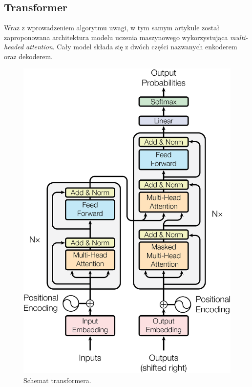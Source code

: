 \documentclass[data-science]{agh-wi} %
\begin{document}
\subsection{Transformer}
Wraz z wprowadzeniem algorytmu uwagi, w tym samym artykule został zaproponowana architektura modelu uczenia maszynowego wykorzystująca \textit{multi-headed attention}. Cały model składa się z dwóch części nazwanych enkoderem oraz dekoderem.

\begin{figure}[!ht]
    \begin{center}
        \includegraphics[width=0.7\linewidth]{img/transformer1}
    \end{center}
    \caption{Schemat transformera.}
    \label{fig:transformer1}
\end{figure}
\end{document}
